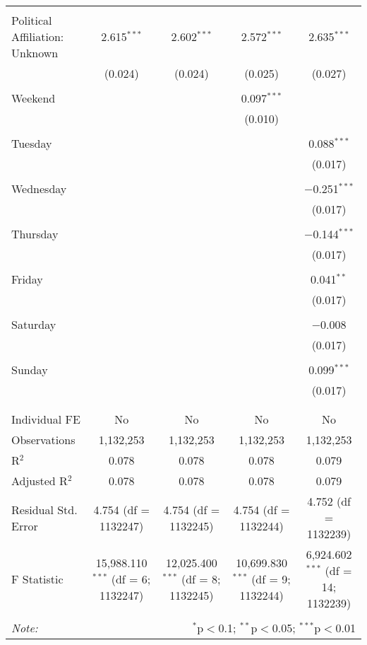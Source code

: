 \documentclass[
]{article}
\begin{document}
\begin{table}[!htbp]
{\begin{tabular}{@{\extracolsep{5pt}}lcccc}
  & & & & \\ 
 Political Affiliation: Unknown & 2.615$^{***}$ & 2.602$^{***}$ & 2.572$^{***}$ & 2.635$^{***}$ \\ 
  & (0.024) & (0.024) & (0.025) & (0.027) \\ 
  & & & & \\ 
 Weekend &  &  & 0.097$^{***}$ &  \\ 
  &  &  & (0.010) &  \\ 
  & & & & \\ 
 Tuesday &  &  &  & 0.088$^{***}$ \\ 
  &  &  &  & (0.017) \\ 
  & & & & \\ 
 Wednesday &  &  &  & $-$0.251$^{***}$ \\ 
  &  &  &  & (0.017) \\ 
  & & & & \\ 
 Thursday &  &  &  & $-$0.144$^{***}$ \\ 
  &  &  &  & (0.017) \\ 
  & & & & \\ 
 Friday &  &  &  & 0.041$^{**}$ \\ 
  &  &  &  & (0.017) \\ 
  & & & & \\ 
 Saturday &  &  &  & $-$0.008 \\ 
  &  &  &  & (0.017) \\ 
  & & & & \\ 
 Sunday &  &  &  & 0.099$^{***}$ \\ 
  &  &  &  & (0.017) \\ 
  & & & & \\ 
\hline \\[-1.8ex] 
Individual FE & No & No & No & No \\ 
Observations & 1,132,253 & 1,132,253 & 1,132,253 & 1,132,253 \\ 
R$^{2}$ & 0.078 & 0.078 & 0.078 & 0.079 \\ 
Adjusted R$^{2}$ & 0.078 & 0.078 & 0.078 & 0.079 \\ 
Residual Std. Error & 4.754 (df = 1132247) & 4.754 (df = 1132245) & 4.754 (df = 1132244) & 4.752 (df = 1132239) \\ 
F Statistic & 15,988.110$^{***}$ (df = 6; 1132247) & 12,025.400$^{***}$ (df = 8; 1132245) & 10,699.830$^{***}$ (df = 9; 1132244) & 6,924.602$^{***}$ (df = 14; 1132239) \\ 
\hline 
\hline \\[-1.8ex] 
\textit{Note:}  & \multicolumn{4}{r}{$^{*}$p$<$0.1; $^{**}$p$<$0.05; $^{***}$p$<$0.01} \\ 
\end{tabular}
} 
\end{table} 
\newpage
\end{document}
